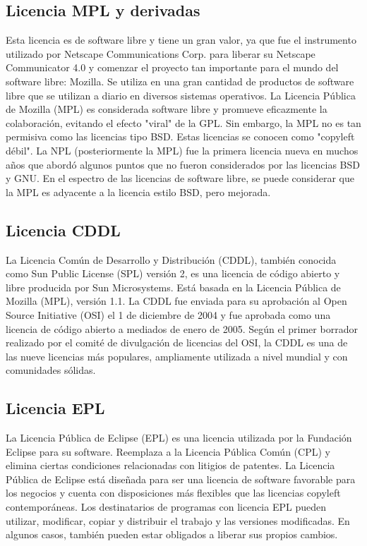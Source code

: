 			\subsection{Licencia MPL y derivadas}\label{mpl}
			
					Esta licencia es de software libre y tiene un gran valor, ya que fue el instrumento utilizado por Netscape Communications Corp. para liberar su Netscape Communicator 4.0 y comenzar el proyecto tan importante para el mundo del software libre: Mozilla. Se utiliza en una gran cantidad de productos de software libre que se utilizan a diario en diversos sistemas operativos. La Licencia Pública de Mozilla (MPL) es considerada software libre y promueve eficazmente la colaboración, evitando el efecto "viral" de la GPL. Sin embargo, la MPL no es tan permisiva como las licencias tipo BSD. Estas licencias se conocen como "copyleft débil". La NPL (posteriormente la MPL) fue la primera licencia nueva en muchos años que abordó algunos puntos que no fueron considerados por las licencias BSD y GNU. En el espectro de las licencias de software libre, se puede considerar que la MPL es adyacente a la licencia estilo BSD, pero mejorada.\par
			
			\subsection{Licencia CDDL}\label{cddl}
			
				La Licencia Común de Desarrollo y Distribución (CDDL), también conocida como Sun Public License (SPL) versión 2, es una licencia de código abierto y libre producida por Sun Microsystems. Está basada en la Licencia Pública de Mozilla (MPL), versión 1.1. La CDDL fue enviada para su aprobación al Open Source Initiative (OSI) el 1 de diciembre de 2004 y fue aprobada como una licencia de código abierto a mediados de enero de 2005. Según el primer borrador realizado por el comité de divulgación de licencias del OSI, la CDDL es una de las nueve licencias más populares, ampliamente utilizada a nivel mundial y con comunidades sólidas.\par
				
			\subsection{Licencia EPL}\label{epl}
			
				La Licencia Pública de Eclipse (EPL) es una licencia utilizada por la Fundación Eclipse para su software. Reemplaza a la Licencia Pública Común (CPL) y elimina ciertas condiciones relacionadas con litigios de patentes. La Licencia Pública de Eclipse está diseñada para ser una licencia de software favorable para los negocios y cuenta con disposiciones más flexibles que las licencias copyleft contemporáneas. Los destinatarios de programas con licencia EPL pueden utilizar, modificar, copiar y distribuir el trabajo y las versiones modificadas. En algunos casos, también pueden estar obligados a liberar sus propios cambios.\par
			
